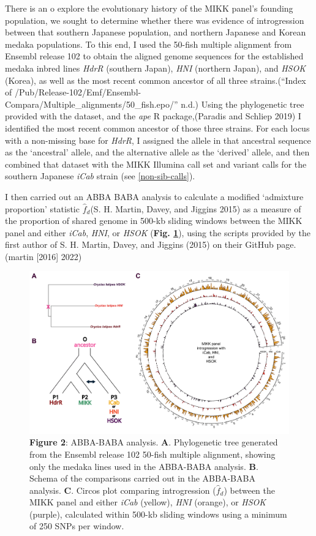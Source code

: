 \documentclass[
]{book}
\begin{document}
There is an o explore the evolutionary history of the MIKK panel's founding population, we sought to determine whether there was evidence of introgression between that southern Japanese population, and northern Japanese and Korean medaka populations. To this end, I used the 50-fish multiple alignment from Ensembl release 102 to obtain the aligned genome sequences for the established medaka inbred lines \emph{HdrR} (southern Japan), \emph{HNI} (northern Japan), and \emph{HSOK} (Korea), as well as the most recent common ancestor of all three strains.({``Index of /Pub/Release-102/Emf/Ensembl-Compara/Multiple\_alignments/50\_fish.epo/''} n.d.) Using the phylogenetic tree provided with the dataset, and the \emph{ape} R package,(Paradis and Schliep 2019) I identified the most recent common ancestor of those three strains. For each locus with a non-missing base for \emph{HdrR}, I assigned the allele in that ancestral sequence as the `ancestral' allele, and the alternative allele as the `derived' allele, and then combined that dataset with the MIKK Illumina call set and variant calls for the southern Japanese \emph{iCab} strain (see \ref{non-sib-calls}).

I then carried out an ABBA BABA analysis to calculate a modified `admixture proportion' statistic \(\hat{f}_d\)(S. H. Martin, Davey, and Jiggins 2015) as a measure of the proportion of shared genome in 500-kb sliding windows between the MIKK panel and either \emph{iCab}, \emph{HNI}, or \emph{HSOK} (\textbf{Fig. \ref{fig:ABBABABA}}), using the scripts provided by the first author of S. H. Martin, Davey, and Jiggins (2015) on their GitHub page.(martin {[}2016{]} 2022)



\begin{figure}
\includegraphics[width=1\linewidth]{figs/mikk_genome/07_introgression} \caption{\textbf{Figure 2}: ABBA-BABA analysis. \textbf{A}. Phylogenetic tree generated from the Ensembl release 102 50-fish multiple alignment, showing only the medaka lines used in the ABBA-BABA analysis. \textbf{B}. Schema of the comparisons carried out in the ABBA-BABA analysis. \textbf{C}. Circos plot comparing introgression (\(\hat{f}_d\)) between the MIKK panel and either \emph{iCab} (yellow), \emph{HNI} (orange), or \emph{HSOK} (purple), calculated within 500-kb sliding windows using a minimum of 250 SNPs per window.}\label{fig:ABBABABA}
\end{figure}
\end{document}
